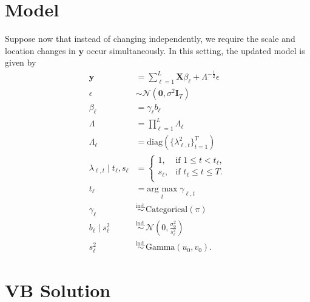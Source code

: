 \documentclass{article}
\newcommand{\argmax}[1]{\underset{#1}{\text{arg max}}}
\begin{document}
\section{Model}

Suppose now that instead of changing independently, we require the scale and location changes in $\mathbf{y}$ occur simultaneously. In this setting, the updated model is given by
\begin{align*}
    \mathbf{y} &= \sum_{\ell=1}^L \mathbf{X} \beta_\ell + \Lambda^{-\frac{1}{2}} \epsilon \\
    \epsilon &\sim \mathcal{N}(\mathbf{0}, \sigma^2 \mathbf{I}_T) \\
    \beta_\ell &= \gamma_\ell b_\ell \\
    \Lambda &= \prod_{\ell=1}^L \Lambda_\ell \\
    \Lambda_{\ell} &= \text{diag}(\{\lambda^2_{\ell,t}\}_{t=1}^T) \\
    \lambda_{\ell,t} \;|\; t_\ell, s_\ell &= 
    \begin{cases}
        1, & \text{if } 1 \leq t < t_\ell, \\
        s_\ell,  & \text{if } t_\ell \leq t \leq T. \\
    \end{cases} \\
    t_\ell &= \argmax{t} \;\gamma_{\ell,t} \\
    \gamma_\ell &\overset{\text{ind.}}{\sim} \text{Categorical}(\pi) \\
    b_\ell \;|\; s_\ell^2 &\overset{\text{ind.}}{\sim} \mathcal{N}\left(0,\frac{\sigma_0^{2}}{s_\ell^2}\right)  \\
    s_\ell^2 &\overset{\text{ind.}}{\sim} \text{Gamma}(u_0, v_0).
\end{align*}

\section{VB Solution}
\end{document}
